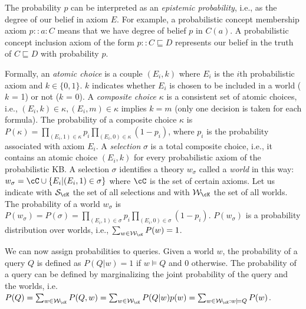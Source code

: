 The probability $p$ can be interpreted as an \emph{epistemic probability}, i.e., as the degree of our belief in axiom $E$. 
For example, a probabilistic concept membership axiom
$
p::a:C
$
means that we have degree of belief $p$ in $C(a)$.
A probabilistic concept inclusion axiom of the form
$
p::C\sqsubseteq D
$
represents our belief in the truth of $C \sqsubseteq D$ with probability $p$. 

Formally, an \emph{atomic choice} is a couple $(E_i,k)$ where $E_i$ is the $i$th probabilistic axiom  and $k\in \{0,1\}$. 
$k$ indicates whether $E_i$ is chosen to be included in a world ($k$ = 1) or not ($k$ = 0). 
A \emph{composite choice} $\kappa$ is a consistent set of atomic choices, i.e.,  $(E_i,k)\in\kappa, (E_i,m)\in \kappa$ implies $k=m$ (only one decision is taken for each formula). 
The probability of a composite choice $\kappa$  is 
$P(\kappa)=\prod_{(E_i,1)\in \kappa}p_i\prod_{(E_i, 0)\in \kappa} (1-p_i)$, where $p_i$ is the probability associated with axiom $E_i$.
A \emph{selection} $\sigma$ is a total composite choice, i.e., it contains an atomic choice $(E_i,k)$ for every 
probabilistic axiom  of the probabilistic KB. 
A selection $\sigma$ identifies a theory $w_\sigma$ called  a \emph{world} in this way:
$w_\sigma=\cC\cup\{E_i|(E_i,1)\in \sigma\}$ where $\cC$ is the set of certain axioms. Let us indicate with $\mathcal{S}_\cK$ the set of all selections and with $\mathcal{W}_\cK$ the set of all worlds.
The probability of a world $w_\sigma$  is 
$P(w_\sigma)=P(\sigma)=\prod_{(E_i,1)\in \sigma}p_i\prod_{(E_i, 0)\in \sigma} (1-p_i)$.
$P(w_\sigma)$ is a probability distribution over worlds, i.e., $\sum_{w\in \mathcal{W}_\cK}P(w)=1$.

We can now assign probabilities to queries. 
Given a world $w$, the probability of a query $Q$ is defined as $P(Q|w)=1$ if $w\models Q$ and 0 otherwise.
The probability of a query can be defined by marginalizing the joint probability of the query and the worlds, i.e.
$P(Q)=\sum_{w\in \mathcal{W}_\cK}P(Q,w)=\sum_{w\in \mathcal{W}_\cK} P(Q|w)p(w)=\sum_{w\in \mathcal{W}_\cK: w\models Q}P(w)$.

